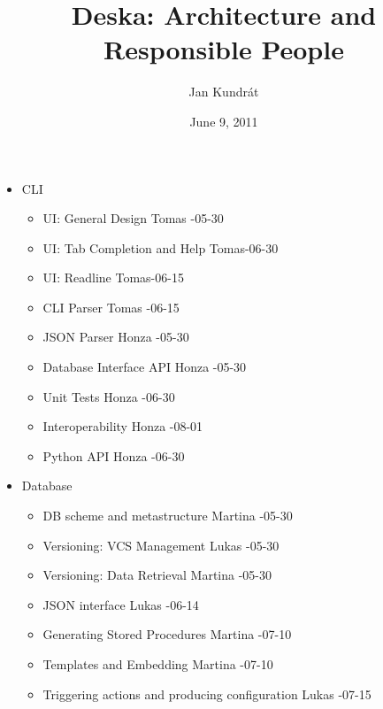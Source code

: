 \documentclass{article}
\begin{document}
\title{Deska: Architecture and Responsible People}

\author{Jan Kundrát}

\date{June 9, 2011}

\maketitle

\TabPositions{12cm,14cm}

\begin{itemize}
    \item CLI
        \begin{itemize}
            \item UI: General Design \tab Tomas -05-30
            \item UI: Tab Completion and Help \tab Tomas-06-30
            \item UI: Readline \tab Tomas-06-15
            \item CLI Parser \tab Tomas -06-15
            \item JSON Parser \tab Honza -05-30
            \item Database Interface API \tab Honza -05-30
            \item Unit Tests \tab Honza -06-30
            \item Interoperability \tab Honza -08-01
            \item Python API \tab Honza -06-30
        \end{itemize}
    \item Database
        \begin{itemize}
            \item DB scheme and metastructure \tab Martina -05-30
            \item Versioning: VCS Management \tab Lukas -05-30
            \item Versioning: Data Retrieval \tab Martina -05-30
            \item JSON interface \tab Lukas -06-14
            \item Generating Stored Procedures \tab Martina -07-10
            \item Templates and Embedding \tab Martina -07-10
            \item Triggering actions and producing configuration \tab Lukas -07-15
        \end{itemize}

\end{itemize}
\end{document}
